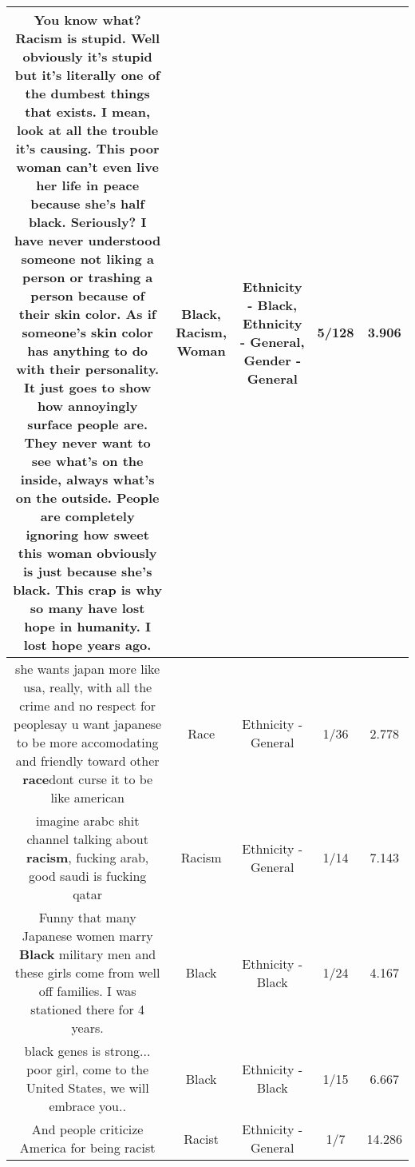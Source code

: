 \documentclass[11pt]{article}
\newlength\mylength
\begin{document}
\begin{center}
\begin{longtable}{|C{.65\mylength}|C{.30\mylength}|C{.12\mylength}|C{.12\mylength}|C{.12\mylength}|}
  \small You know what? \textbf{Racism} is stupid. Well obviously it's stupid but it's literally one of the dumbest things that exists. I mean, look at all the trouble it's causing. This poor \textbf{woman} can't even live her life in peace because she's half \textbf{black}. Seriously? I have never understood someone not liking a person or trashing a person because of their skin color. As if someone's skin color has anything to do with their personality. It just goes to show how annoyingly surface people are. They never want to see what's on the inside, always what's on the outside. People are completely ignoring how sweet this \textbf{woman} obviously is just because she's \textbf{black}. This crap is why so many have lost hope in humanity. I lost hope years ago.\normalsize   & Black, Racism, Woman & Ethnicity - Black, Ethnicity - General, Gender - General & 5/128 & 3.906 \\  \hline
  \small she wants japan more like usa, really, with all the crime and no respect for peoplesay u want japanese to be more accomodating and friendly toward other \textbf{race}dont curse it to be like american\normalsize   & Race & Ethnicity - General & 1/36 & 2.778 \\  \hline
  \small imagine arabc shit channel  talking about \textbf{racism},   fucking arab, good saudi is fucking qatar\normalsize   & Racism & Ethnicity - General & 1/14 & 7.143 \\  \hline
  \small Funny that many Japanese women marry \textbf{Black} military men and these girls come from well off families. I was stationed there for 4 years.\normalsize   & Black & Ethnicity - Black & 1/24 & 4.167 \\  \hline
  \small black genes is strong... poor girl, come to the United States, we will embrace you..\normalsize   & Black & Ethnicity - Black & 1/15 & 6.667 \\  \hline
  \small And people criticize America for being racist\normalsize   & Racist & Ethnicity - General & 1/7 & 14.286 \\  \hline

\end{longtable}
\end{center}
\end{document}
